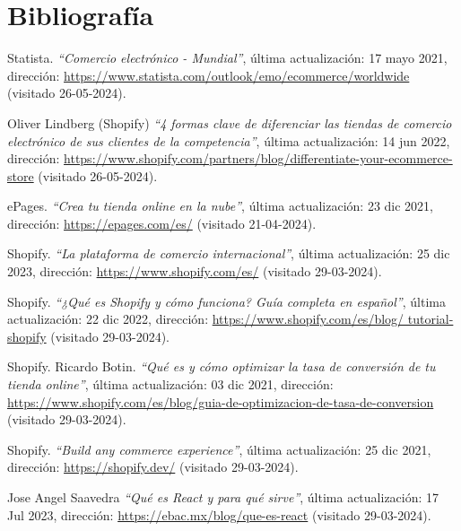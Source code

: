 \documentclass[12pt]{article}
\begin{document}
\section{Bibliografía}
\renewcommand{\refname}{}
\begin{thebibliography}{100} %
    
    Statista. 
    \textit{``Comercio electrónico - Mundial''}, última actualización: 17 mayo 2021, dirección: \url{https://www.statista.com/outlook/emo/ecommerce/worldwide} (visitado 26-05-2024).

    Oliver Lindberg (Shopify)
    \textit{``4 formas clave de diferenciar las tiendas de comercio electrónico de sus clientes de la competencia''}, última actualización: 14 jun 2022, dirección: \url{https://www.shopify.com/partners/blog/differentiate-your-ecommerce-store} (visitado 26-05-2024).

    ePages. 
    \textit{``Crea tu tienda online en la nube''}, última actualización: 23 dic 2021, dirección: \url{https://epages.com/es/} (visitado 21-04-2024).

    Shopify. 
    \textit{``La plataforma de comercio internacional''}, última actualización: 25 dic 2023, dirección: \url{https://www.shopify.com/es/} (visitado 29-03-2024).

    Shopify. 
    \textit{ ``¿Qué es Shopify y cómo funciona? Guía completa en español''},  última actualización: 22 dic 2022, dirección: \url{https://www.shopify.com/es/blog/
    tutorial-shopify} (visitado 29-03-2024).

    Shopify. Ricardo Botin. 
    \textit{``Qué es y cómo optimizar la tasa de conversión de tu tienda online''}, última actualización: 03 dic 2021, dirección: \url{https://www.shopify.com/es/blog/guia-de-optimizacion-de-tasa-de-conversion} (visitado 29-03-2024).

    Shopify. 
    \textit{``Build any commerce experience''}, última actualización: 25 dic 2021, dirección: \url{https://shopify.dev/} (visitado 29-03-2024).

    Jose Angel Saavedra
    \textit{``Qué es React y para qué sirve''}, última actualización: 17 Jul 2023, dirección: \url{https://ebac.mx/blog/que-es-react} (visitado 29-03-2024).


\end{thebibliography}
\end{document}
